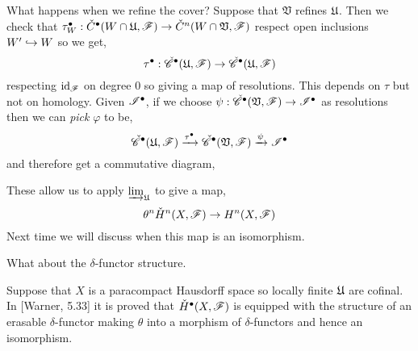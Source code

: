 \documentclass[12pt]{article}
\begin{document}
\newcommand{\V}{\mathfrak{V}}

\begin{rmk}
What happens when we refine the cover? Suppose that $\V$ refines $\mathfrak{U}$. Then we check that $\tau^\bullet_W  : \check{C}^\bullet(W \cap \U, \F) \to \check{C}^n(W \cap \V, \F)$ respect open inclusions $W' \hookrightarrow W$ so we get,
\[ \tau^\bullet : \check{\mathscr{C}}^\bullet(\mathfrak{U}, \mathscr{F}) \to \check{\mathscr{C}}^\bullet(\mathfrak{U}, \mathscr{F}) \]
respecting $\mathrm{id}_{\mathscr{F}}$ on degree $0$ so giving a map of resolutions. This depends on $\tau$ but not on homology. Given $\mathscr{I}^\bullet$, if we choose $\psi : \Cech^\bullet(\V, \F) \to \I^\bullet$ as resolutions then we can \textit{pick} $\varphi$ to be,
\[ \Cech^\bullet(\U, \F) \xrightarrow{\tau^\bullet} \Cech^\bullet(\V, \F) \xrightarrow{\psi} \I^\bullet \]
and therefore get a commutative diagram,
\begin{center}
\end{center}
These allow us to apply $\varinjlim_{\mathfrak{U}}$ to give a map,
\[ \theta^n  \check{H}^n(X, \mathscr{F}) \to H^n(X, \mathscr{F}) \]
Next time we will discuss when this map is an isomorphism.
\end{rmk}

\begin{rmk}
What about the $\delta$-functor structure. 
\end{rmk}

\begin{example}
Suppose that $X$ is a paracompact Hausdorff space so locally finite $\mathfrak{U}$ are cofinal. In [Warner, 5.33] it is proved that $\check{H}^\bullet(X, \mathscr{F})$ is equipped with the structure of an erasable $\delta$-functor making $\theta$ into a morphism of $\delta$-functors and hence an isomorphism. 
\end{example}
\end{document}
